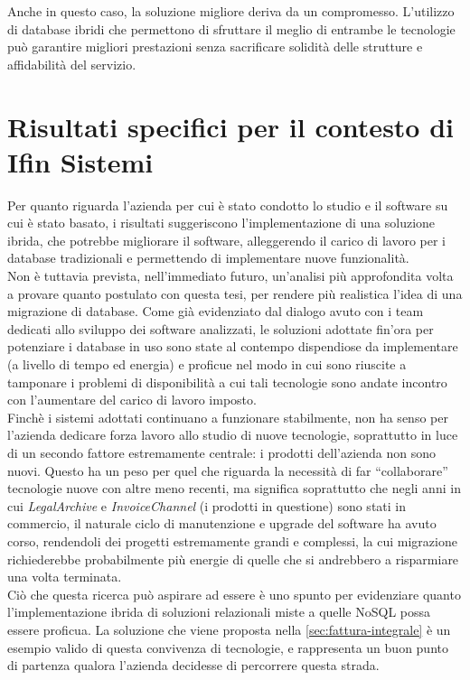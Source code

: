 \noindent Anche in questo caso, la soluzione migliore deriva da un compromesso. L'utilizzo di database ibridi che permettono di sfruttare il meglio di entrambe le tecnologie può garantire migliori prestazioni senza sacrificare solidità delle strutture e affidabilità del servizio.\\


\section{Risultati specifici per il contesto di Ifin Sistemi}
Per quanto riguarda l'azienda per cui è stato condotto lo studio e il software su cui è stato basato, i risultati suggeriscono l'implementazione di una soluzione ibrida, che potrebbe migliorare il software, alleggerendo il carico di lavoro per i database tradizionali e permettendo di implementare nuove funzionalità.\\

\noindent Non è tuttavia prevista, nell'immediato futuro, un'analisi più approfondita volta a provare quanto postulato con questa tesi, per rendere più realistica l'idea di una migrazione di database. Come già evidenziato dal dialogo avuto con i team dedicati allo sviluppo dei software analizzati, le soluzioni adottate fin'ora per potenziare i database in uso sono state al contempo dispendiose da implementare (a livello di tempo ed energia) e proficue nel modo in cui sono riuscite a tamponare i problemi di disponibilità a cui tali tecnologie sono andate incontro con l'aumentare del carico di lavoro imposto.\\
Finchè i sistemi adottati continuano a funzionare stabilmente, non ha senso per l'azienda dedicare forza lavoro allo studio di nuove tecnologie, soprattutto in luce di un secondo fattore estremamente centrale: i prodotti dell'azienda non sono nuovi. Questo ha un peso per quel che riguarda la necessità di far ``collaborare'' tecnologie nuove con altre meno recenti, ma significa soprattutto che negli anni in cui \textit{LegalArchive} e \textit{InvoiceChannel} (i prodotti in questione) sono stati in commercio, il naturale ciclo di manutenzione e upgrade del software ha avuto corso, rendendoli dei progetti estremamente grandi e complessi, la cui migrazione richiederebbe probabilmente più energie di quelle che si andrebbero a risparmiare una volta terminata.\\

\noindent Ciò che questa ricerca può aspirare ad essere è uno spunto per evidenziare quanto l'implementazione ibrida di soluzioni relazionali miste a quelle NoSQL possa essere proficua. La soluzione che viene proposta nella \autoref{sec:fattura-integrale} è un esempio valido di questa convivenza di tecnologie, e rappresenta un buon punto di partenza qualora l'azienda decidesse di percorrere questa strada.\\

